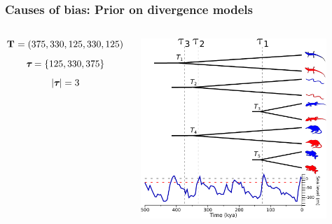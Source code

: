 \begin{frame}
    \frametitle{Causes of bias: Prior on divergence models}
    \begin{columns}[c]
            \begin{displaybox}[4.5cm]
                {\small
                \[
                    \mathbf{T_{}} = (375,330,125,330,125)
                \]\vspace{0mm}
                }
                \[
                    \boldsymbol{\tau_{}} = \{125,330,375\}
                \]\vspace{0mm}
                \[
                    \lvert \boldsymbol{\tau_{}} \rvert = 3
                \]\vspace{0mm}
            \end{displaybox}
            \includegraphics[height=6.8cm]{../images/sea-level-prediction-trees-labels-compact-alt2.pdf}
    \end{columns}
\end{frame}

